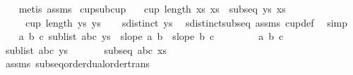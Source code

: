 \begin{isabellebody}
\ \ \isamarkupfalse%
\ {\isacharparenleft}{\kern0pt}metis\ assms{\isacharparenleft}{\kern0pt}{}{\isacharcomma}{\kern0pt}{}{\isacharparenright}{\kern0pt}{\isacharparenright}{\kern0pt}%
\endisatagproof
{\isafoldproof}%
%
\isadelimproof
\isanewline
%
\endisadelimproof
\isanewline
{}\isamarkupfalse%
\ cup{\isacharunderscore}{\kern0pt}sub{\isacharunderscore}{\kern0pt}cup{\isacharcolon}{\kern0pt}\isanewline
\ \ \ {\isachardoublequoteopen}cup\ {\isacharparenleft}{\kern0pt}length\ xs{\isacharparenright}{\kern0pt}\ xs{\isachardoublequoteclose}\ \ {\isachardoublequoteopen}subseq\ ys\ xs{\isachardoublequoteclose}\isanewline
\ \ \ \ \ {\isachardoublequoteopen}cup\ {\isacharparenleft}{\kern0pt}length\ ys{\isacharparenright}{\kern0pt}\ ys{\isachardoublequoteclose}\isanewline
%
\isadelimproof
%
\endisadelimproof
%
\isatagproof
{}\isamarkupfalse%
{\isacharminus}{\kern0pt}\isanewline
\ \ \isamarkupfalse%
\ {}{\isacharcolon}{\kern0pt}{\isachardoublequoteopen}sdistinct\ ys{\isachardoublequoteclose}\ \isamarkupfalse%
\ sdistinct{\isacharunderscore}{\kern0pt}subseq\ assms\ cup{\isacharunderscore}{\kern0pt}def\ \isamarkupfalse%
\ simp\isanewline
\ \ \isamarkupfalse%
\ {\isachardoublequoteopen}{\isasymAnd}a\ b\ c{\isachardot}{\kern0pt}\ sublist\ {\isacharbrackleft}{\kern0pt}a{\isacharcomma}{\kern0pt}b{\isacharcomma}{\kern0pt}c{\isacharbrackright}{\kern0pt}\ ys\ {\isasymLongrightarrow}\ slope\ a\ b\ {\isacharless}{\kern0pt}\ slope\ b\ c{\isachardoublequoteclose}\isanewline
\ \ \isamarkupfalse%
{\isacharminus}{\kern0pt}\isanewline
\ \ \ \ \isamarkupfalse%
\ a\ b\ c\ \isanewline
\ \ \ \ \isamarkupfalse%
\ {\isachardoublequoteopen}sublist\ {\isacharbrackleft}{\kern0pt}a{\isacharcomma}{\kern0pt}b{\isacharcomma}{\kern0pt}c{\isacharbrackright}{\kern0pt}\ ys{\isachardoublequoteclose}\isanewline
\ \ \ \ \isamarkupfalse%
\ \ {\isachardoublequoteopen}subseq\ {\isacharbrackleft}{\kern0pt}a{\isacharcomma}{\kern0pt}b{\isacharcomma}{\kern0pt}c{\isacharbrackright}{\kern0pt}\ xs{\isachardoublequoteclose}\isanewline
\ \ \ \ \ \ \isamarkupfalse%
\ assms{\isacharparenleft}{\kern0pt}{}{\isacharparenright}{\kern0pt}\ subseq{\isacharunderscore}{\kern0pt}order{\isachardot}{\kern0pt}dual{\isacharunderscore}{\kern0pt}order{\isachardot}{\kern0pt}trans\ \isamarkupfalse%

\end{isabellebody}
